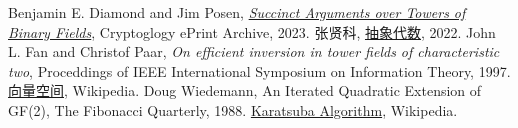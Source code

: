 \documentclass[10pt]{ctexart}
\begin{document}
\begin{thebibliography}{10}
    Benjamin E. Diamond and Jim Posen, \href{https://eprint.iacr.org/2023/1784}{\textit{Succinct Arguments over Towers of Binary Fields}}, Cryptoglogy ePrint Archive, 2023.
    张贤科, \href{https://book.douban.com/subject/36007684/}{抽象代数}, 2022. 
    John L. Fan and Christof Paar, \textit{On efficient inversion in tower fields of characteristic two}, Proceddings of IEEE International Symposium on Information Theory, 1997.
    \href{https://zh.wikipedia.org/zh-cn/%E5%90%91%E9%87%8F%E7%A9%BA%E9%97%B4}{向量空间}, Wikipedia.
    Doug Wiedemann, An Iterated Quadratic Extension of GF(2), The Fibonacci Quarterly, 1988.
    \href{https://en.wikipedia.org/wiki/Karatsuba_algorithm}{Karatsuba Algorithm}, Wikipedia.
\end{thebibliography}
\end{document}
